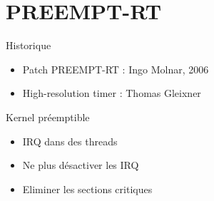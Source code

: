 \section{PREEMPT-RT}
\begin{frame}
\begin{block}{Historique}
\begin{itemize}
	\item Patch PREEMPT-RT : Ingo Molnar, 2006
	\item High-resolution timer : Thomas Gleixner
\end{itemize}
\end{block}
\begin{block}{Kernel préemptible}
\begin{itemize}
	\item IRQ dans des threads
	\item Ne plus désactiver les IRQ
	\item Eliminer les sections critiques %
\end{itemize}
\end{block}

\end{frame}

